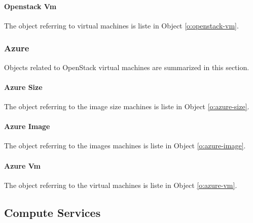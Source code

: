 \documentclass[10pt]{article}
\begin{document}
\paragraph{Openstack Vm}

The object referring to virtual machines is liste in Object \ref{o:openstack-vm}.



\subsubsection{Azure}\label{S:azure}

Objects related to OpenStack virtual machines are summarized in this
section.

\paragraph{Azure Size}

The object referring to the image size machines is liste in Object \ref{o:azure-size}.



\paragraph{Azure Image}

The object referring to the images machines is liste in Object
\ref{o:azure-image}.


\paragraph{Azure Vm}

The object referring to the virtual machines is liste in Object
\ref{o:azure-vm}.
 


\subsection{Compute Services}
\end{document}
